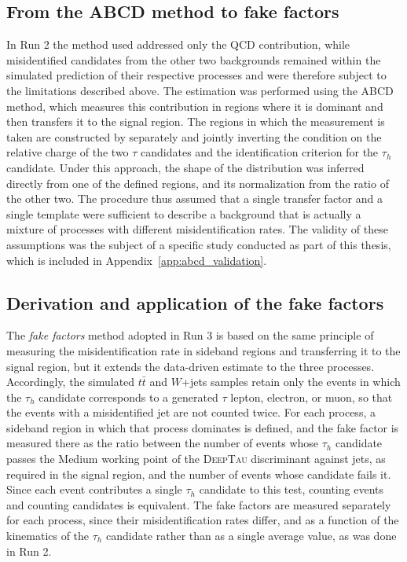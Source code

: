 \subsection{From the ABCD method to fake factors}
%
In Run 2 the method used addressed only the QCD contribution, while misidentified candidates from the other two backgrounds remained within the simulated prediction of their respective processes and were therefore subject to the limitations described above. The estimation was performed using the ABCD method, which measures this contribution in regions where it is dominant and then transfers it to the signal region. The regions in which the measurement is taken are constructed by separately and jointly inverting the condition on the relative charge of the two $\tau$ candidates and the identification criterion for the $\tau_h$ candidate. Under this approach, the shape of the distribution was inferred directly from one of the defined regions, and its normalization from the ratio of the other two. The procedure thus assumed that a single transfer factor and a single template were sufficient to describe a background that is actually a mixture of processes with different misidentification rates. The validity of these assumptions was the subject of a specific study conducted as part of this thesis, which is included in Appendix~\ref{app:abcd_validation}.

\subsection{Derivation and application of the fake factors}
%
The \textit{fake factors} method adopted in Run 3 is based on the same principle of measuring the misidentification rate in sideband regions and transferring it to the signal region, but it extends the data-driven estimate to the three processes. Accordingly, the simulated $t\bar{t}$ and $W$+jets samples retain only the events in which the $\tau_h$ candidate corresponds to a generated $\tau$ lepton, electron, or muon, so that the events with a misidentified jet are not counted twice. For each process, a sideband region in which that process dominates is defined, and the fake factor is measured there as the ratio between the number of events whose $\tau_h$ candidate passes the Medium working point of the \textsc{DeepTau} discriminant against jets, as required in the signal region, and the number of events whose candidate fails it. Since each event contributes a single $\tau_h$ candidate to this test, counting events and counting candidates is equivalent. The fake factors are measured separately for each process, since their misidentification rates differ, and as a function of the kinematics of the $\tau_h$ candidate rather than as a single average value, as was done in Run 2.\medskip



